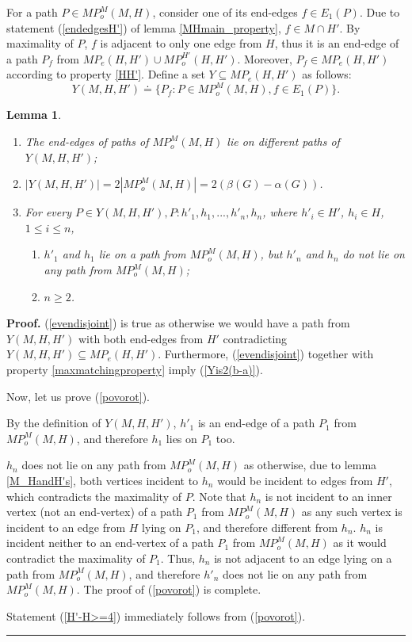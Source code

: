 \documentclass[a4paper, 12pt]{article}
\newtheorem{lemmasection}[definition]{Lemma}
\newenvironment{proof}[1][Proof]{\noindent\textbf{#1.} }{\ \rule{0.5em}{0.5em}}
\begin{document}
For a path $P \in MP_o^M(M, H)$, consider one of its end-edges $f
\in E_1(P)$. Due to statement (\ref{endedgesH'}) of lemma
\ref{MHmain_property}, $f \in M \cap H'$. By maximality of $P$, $f$
is adjacent to only one edge from $H$, thus it is an end-edge of a
path $P_f$ from $MP_e(H,H') \cup MP_o^{H'}(H,H')$. Moreover, $P_f
\in MP_e(H,H')$ according to property \ref{HH'}. Define a set $Y
\subseteq MP_e(H,H')$ as follows: $$Y(M,H,H') \doteq \{P_f : P \in
MP_o^M(M, H), f \in E_1(P) \}.$$

\begin{lemmasection}\label{Y_stuff}\
\begin{enumerate}
\renewcommand{\labelenumi}{(\arabic{enumi})}
\item \label{evendisjoint} The end-edges of paths of $MP_o^M(M,H)$
lie on different paths of $Y(M,H,H')$;
\item \label{Yis2(b-a)} $|Y(M,H,H')| = 2|MP_o^M(M,H)| = 2(\beta(G) -
\alpha(G))$.
\item For every $P \in Y(M,H,H'), P : h'_1, h_1, ..., h'_n,
h_n$, where $h'_i \in H'$, $h_i \in H$, $1 \leq i \leq n$,
\begin{enumerate}
\renewcommand{\labelenumii}{(\alph{enumii})}
\item \label{povorot}
$h'_1$ and $h_1$ lie on a path from $MP_o^M(M,H)$, but $h'_n$ and
$h_n$ do not lie on any path from $MP_o^M(M,H)$;
\item \label{H'-H>=4} $n \geq 2$.
\end{enumerate}
\end{enumerate}
\end{lemmasection}
\begin{proof}
(\ref{evendisjoint}) is true as otherwise we would have a path from
$Y(M,H,H')$ with both end-edges from $H'$ contradicting $Y(M,H,H')
\subseteq MP_e(H,H')$. Furthermore, (\ref{evendisjoint}) together
with property \ref{maxmatchingproperty} imply (\ref{Yis2(b-a)}).

Now, let us prove (\ref{povorot}).

By the definition of $Y(M,H,H')$, $h'_1$ is an end-edge of a path
$P_1$ from $MP_o^M(M,H)$, and therefore $h_1$ lies on $P_1$ too.

$h_n$ does not lie on any path from $MP_o^M(M,H)$ as otherwise, due
to lemma \ref{M_HandH's}, both vertices incident to $h_n$ would be
incident to edges from $H'$, which contradicts the maximality of
$P$. Note that $h_n$ is not incident to an inner vertex (not an
end-vertex) of a path $P_1$ from $MP_o^M(M,H)$ as any such vertex is
incident to an edge from $H$ lying on $P_1$, and therefore different
from $h_n$. $h_n$ is incident neither to an end-vertex of a path
$P_1$ from $MP_o^M(M,H)$ as it would contradict the maximality of
$P_1$. Thus, $h_n$ is not adjacent to an edge lying on a path from
$MP_o^M(M,H)$, and therefore $h'_n$ does not lie on any path from
$MP_o^M(M,H)$. The proof of (\ref{povorot}) is complete.

Statement (\ref{H'-H>=4}) immediately follows from (\ref{povorot}).
\end{proof}
\end{document}
